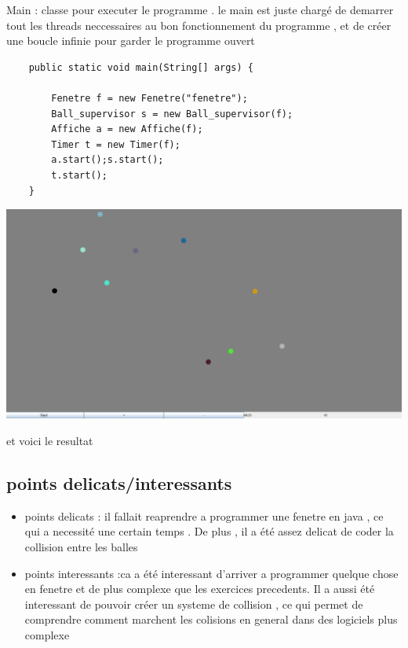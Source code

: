 \documentclass{report}
\begin{document}
 Main : classe pour executer le programme . le main est juste chargé de demarrer tout les threads neccessaires au bon fonctionnement du programme , et de créer une boucle infinie pour garder le programme ouvert

\begin{verbatim}
	public static void main(String[] args) {
	
		Fenetre f = new Fenetre("fenetre");
		Ball_supervisor s = new Ball_supervisor(f);
		Affiche a = new Affiche(f);
		Timer t = new Timer(f);
		a.start();s.start();
		t.start();
	}
\end{verbatim}



\begin{center}
  \includegraphics[scale=0.5]{Exo4.PNG}
\end{center}
et voici le resultat 

\subsection{points delicats/interessants }
\begin{itemize}
\item points delicats : il fallait reaprendre a programmer une fenetre en java , ce qui a necessité une certain temps . 
De plus , il a été assez delicat de coder la collision entre les balles  
\item points interessants :ca a été interessant d'arriver a programmer quelque chose en fenetre et de plus complexe que les exercices precedents.
Il a aussi été interessant de pouvoir créer un systeme de collision , ce qui permet de comprendre comment marchent les colisions en general dans 
des logiciels plus complexe

\end{itemize}
\end{document}
